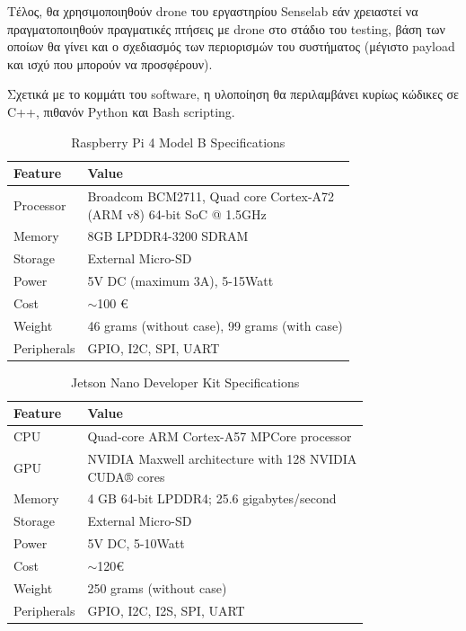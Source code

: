 Τέλος, θα χρησιμοποιηθούν drone του εργαστηρίου Senselab εάν χρειαστεί να πραγματοποιηθούν πραγματικές πτήσεις με drone στο στάδιο του testing,
βάση των οποίων θα γίνει και ο σχεδιασμός των περιορισμών του συστήματος (μέγιστο payload και ισχύ που μπορούν να προσφέρουν). 

Σχετικά με το κομμάτι του software, η υλοποίηση θα πε\-ρι\-λα\-μβάνει κυρίως κώδικες σε C++, πιθανόν Python και Bash scripting.

\begin{table}[H]
  \caption[]{Raspberry Pi 4 Model B Specifications}
  \label{tab:1}
  \centering
  \begin{tabular}{ll}
      \hline
      \textbf{Feature} & \textbf{Value}  \\
      \hline
          Processor & \Centerstack{Broadcom BCM2711, Quad core Cortex-A72 \\(ARM v8) 64-bit SoC @ 1.5GHz }\\
          Memory & 8GB LPDDR4-3200 SDRAM \\
          Storage & External Micro-SD \\  
          Power & 5V DC (maximum 3A), 5-15Watt \\
          Cost & $\sim$100 €\\
          Weight & 46 grams (without case), 99 grams (with case) \\
          Peripherals & GPIO, I2C, SPI, UART \\
          \hline
  \end{tabular}
\end{table}


\begin{table}[H]
  \caption[]{Jetson Nano Developer Kit Specifications}
  \label{tab:2}
  \centering
  \begin{tabular}{ll}
      \hline
      \textbf{Feature} & \textbf{Value}  \\
      \hline
          CPU & Quad-core ARM Cortex-A57 MPCore processor\\
          GPU & \Centerstack{NVIDIA Maxwell architecture with 128 NVIDIA\\ CUDA® cores} \\
          Memory & 4 GB 64-bit LPDDR4; 25.6 gigabytes/second \\
          Storage & External Micro-SD \\  
          Power & 5V DC, 5-10Watt \\
          Cost & $\sim$120€\\
          Weight & 250 grams (without case)\\
          Peripherals & GPIO, I2C, I2S, SPI, UART \\
          \hline
  \end{tabular}
\end{table}

